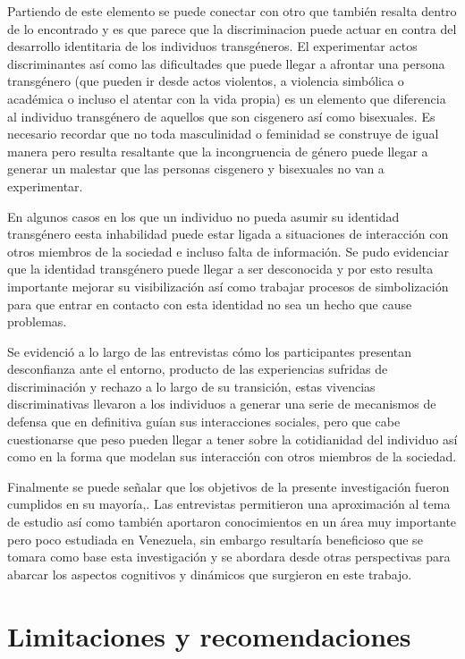 Partiendo de este elemento se puede conectar con otro que también resalta dentro
de lo encontrado y es que parece que la discriminacion puede actuar en contra
del desarrollo identitaria de los individuos transgéneros. El experimentar actos
discriminantes así como las dificultades que puede llegar a afrontar una persona
transgénero (que pueden ir desde actos violentos, a violencia simbólica o
académica o incluso el atentar con la vida propia) es un elemento que diferencia
al individuo transgénero de aquellos que son cisgenero así como bisexuales. Es
necesario recordar que no toda masculinidad o feminidad se construye de igual
manera pero resulta resaltante que la incongruencia de género puede llegar a
generar un malestar que las personas cisgenero y bisexuales no van a
experimentar.

En algunos casos en los que un individuo no pueda asumir su identidad
transgénero eesta inhabilidad puede estar ligada a situaciones de interacción
con otros miembros de la sociedad e incluso falta de información. Se pudo
evidenciar que la identidad transgénero puede llegar a ser desconocida y por
esto resulta importante mejorar su visibilización así como trabajar procesos de
simbolización para que entrar en contacto con esta identidad no sea un hecho que
cause problemas.

Se evidenció a lo largo de las entrevistas cómo los participantes presentan
desconfianza ante el entorno, producto de las experiencias sufridas de
discriminación y rechazo a lo largo de su transición, estas vivencias
discriminativas llevaron a los individuos a generar una serie de mecanismos de
defensa que en definitiva guían sus interacciones sociales, pero que cabe
cuestionarse que peso pueden llegar a tener sobre la cotidianidad del individuo
así como en la forma que modelan sus interacción con otros miembros de la
sociedad.

Finalmente se puede señalar que los objetivos de la presente investigación
fueron cumplidos en su mayoría,. Las entrevistas permitieron una aproximación al
tema de estudio así como también aportaron conocimientos en un área muy
importante pero poco estudiada en Venezuela, sin embargo resultaría beneficioso
que se tomara como base esta investigación y se abordara desde otras
perspectivas para abarcar los aspectos cognitivos y dinámicos que surgieron en
este trabajo.

\section{Limitaciones y recomendaciones}

